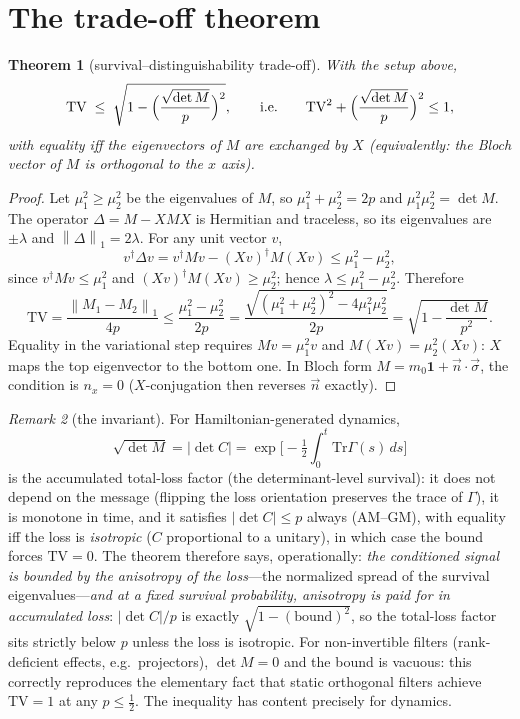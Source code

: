 \documentclass[11pt]{article}
\newtheorem{theorem}{Theorem}[section]
\theoremstyle{remark}
\newtheorem{remark}[theorem]{Remark}
\newcommand{\TV}{\mathrm{TV}}
\newcommand{\Tr}{\mathrm{Tr}}
\newcommand{\norm}[1]{\left\lVert #1 \right\rVert}
\begin{document}
\section{The trade-off theorem}
\label{sec:main}

\begin{theorem}[survival--distinguishability trade-off]
\label{thm:main}
With the setup above,
\begin{equation}
\TV\;\le\;\sqrt{1-\Bigl(\frac{\sqrt{\det M}}{p}\Bigr)^{2}} ,
\qquad\text{i.e.}\qquad
\TV^{2}+\Bigl(\frac{\sqrt{\det M}}{p}\Bigr)^{2}\le 1 ,
\label{eq:main}
\end{equation}
with equality iff the eigenvectors of $M$ are exchanged by $X$
(equivalently: the Bloch vector of $M$ is orthogonal to the $x$
axis).
\end{theorem}

\begin{proof}
Let $\mu_1^{2}\ge\mu_2^{2}$ be the eigenvalues of $M$, so
$\mu_1^{2}+\mu_2^{2}=2p$ and $\mu_1^{2}\mu_2^{2}=\det M$. The
operator $\Delta=M-XMX$ is Hermitian and traceless, so its
eigenvalues are $\pm\lambda$ and
$\norm{\Delta}_1=2\lambda$. For any unit vector $v$,
\[
v^{\dagger}\Delta v
=v^{\dagger}Mv-(Xv)^{\dagger}M(Xv)
\le \mu_1^{2}-\mu_2^{2},
\]
since $v^{\dagger}Mv\le\mu_1^{2}$ and
$(Xv)^{\dagger}M(Xv)\ge\mu_2^{2}$; hence
$\lambda\le\mu_1^{2}-\mu_2^{2}$. Therefore
\[
\TV=\frac{\norm{M_1-M_2}_1}{4p}
\le\frac{\mu_1^{2}-\mu_2^{2}}{2p}
=\frac{\sqrt{(\mu_1^{2}+\mu_2^{2})^{2}-4\mu_1^{2}\mu_2^{2}}}{2p}
=\sqrt{1-\frac{\det M}{p^{2}}}.
\]
Equality in the variational step requires $Mv=\mu_1^{2}v$ and
$M(Xv)=\mu_2^{2}(Xv)$: $X$ maps the top eigenvector to the bottom
one. In Bloch form $M=m_0\mathbf 1+\vec n\cdot\vec\sigma$, the
condition is $n_x=0$ ($X$-conjugation then reverses $\vec n$
exactly).
\end{proof}

\begin{remark}[the invariant]
For Hamiltonian-generated dynamics,
\[
\sqrt{\det M}=|\det C|
=\exp\bigl[-\tfrac12\textstyle\int_0^t\Tr\Gamma(s)\,ds\bigr]
\]
is the accumulated
total-loss factor (the determinant-level survival): it does not
depend on the message (flipping the
loss orientation preserves the trace of $\Gamma$), it is monotone
in time, and it satisfies $|\det C|\le p$ always (AM--GM), with
equality iff the loss is \emph{isotropic} ($C$ proportional to a
unitary), in which case the bound forces $\TV=0$. The theorem
therefore says, operationally: \emph{the conditioned signal is
bounded by the anisotropy of the loss}---the normalized spread of
the survival eigenvalues---\emph{and at a fixed survival probability,
anisotropy is paid for in accumulated loss}: $|\det C|/p$ is exactly
$\sqrt{1-(\text{bound})^{2}}$, so the total-loss factor sits strictly
below $p$ unless the loss is isotropic. For
non-invertible filters (rank-deficient effects, e.g.\ projectors), $\det M=0$ and the bound is
vacuous: this correctly reproduces the elementary fact that static
orthogonal filters achieve $\TV=1$ at any $p\le\tfrac12$. The
inequality has content precisely for dynamics.
\end{remark}
\end{document}

